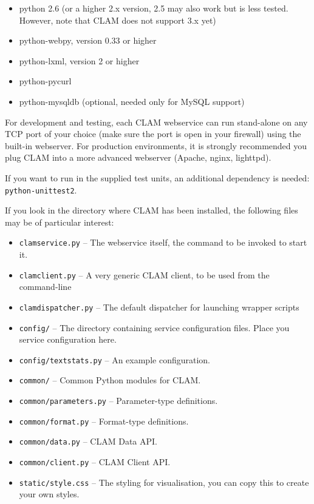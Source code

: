 \documentclass[a4paper,12pt]{report}
\begin{document}
\begin{itemize}
\item python 2.6 (or a higher 2.x version, 2.5 may also work but is less tested. However, note that CLAM does not support 3.x yet)
\item python-webpy, version 0.33 or higher
\item python-lxml, version 2 or higher
\item python-pycurl
\item python-mysqldb (optional, needed only for MySQL support)
\end{itemize}

For development and testing, each CLAM webservice can run stand-alone on any
TCP port of your choice (make sure the port is open in your firewall) using the
built-in webserver. For production environments, it is strongly recommended you
plug CLAM into a more advanced webserver (Apache, nginx, lighttpd). 

If you want to run in the supplied test units, an additional dependency is
needed: \texttt{python-unittest2}.

If you look in the directory where CLAM has been installed, the following files
may be of particular interest:

\begin{itemize}
\item \texttt{clamservice.py} -- The webservice itself, the command to be invoked to start it.
\item \texttt{clamclient.py} -- A very generic CLAM client, to be used from the command-line
\item \texttt{clamdispatcher.py} -- The default dispatcher for launching wrapper scripts
\item \texttt{config/} -- The directory containing service configuration files. Place you service configuration here.
\item \texttt{config/textstats.py} -- An example configuration.
\item \texttt{common/} -- Common Python modules for CLAM.
\item \texttt{common/parameters.py} -- Parameter-type definitions.
\item \texttt{common/format.py} -- Format-type definitions.
\item \texttt{common/data.py} -- CLAM Data API.
\item \texttt{common/client.py} -- CLAM Client API.
\item \texttt{static/style.css} -- The styling for visualisation, you can copy this to create your own styles.
\end{itemize}
\end{document}
